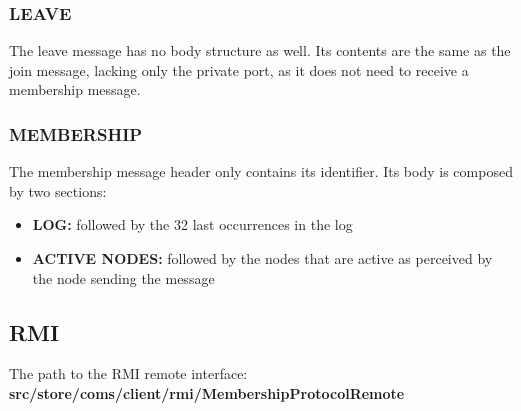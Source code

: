 \subsubsection{LEAVE}

The leave message has no body structure as well. Its contents are the same as the join message, lacking only the private port, as it does not need to receive a membership message.


\subsubsection{MEMBERSHIP}

The membership message header only contains its identifier. Its body is composed by two sections:
\begin{itemize}
    \item \textbf{LOG:} followed by the 32 last occurrences in the log 
    \item \textbf{ACTIVE NODES:} followed by the nodes that are active as perceived by the node sending the message
\end{itemize}

\subsection{RMI}

The path to the RMI remote interface: \textbf{src/store/coms/client/rmi/MembershipProtocolRemote}

